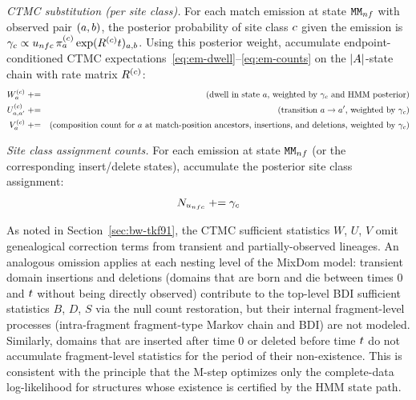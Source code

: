 \emph{CTMC substitution (per site class).}
For each match emission at state ${\tt M}{\tt M}_{nf}$ with observed pair $(a,b)$,
the posterior probability of site class $c$ given the emission is
$\gamma_c \propto u_{nfc}\, \pi^{(c)}_a \exp(R^{(c)} t)_{a,b}$.
Using this posterior weight, accumulate endpoint-conditioned CTMC
expectations~\eqref{eq:em-dwell}--\eqref{eq:em-counts}
on the $|A|$-state chain with rate matrix $R^{(c)}$:
\begin{eqnarray*}
W^{(c)}_a & \mathrel{+}= & \text{(dwell in state $a$, weighted by $\gamma_c$ and HMM posterior)} \\
U^{(c)}_{a,a'} & \mathrel{+}= & \text{(transition $a \to a'$, weighted by $\gamma_c$)} \\
V^{(c)}_a & \mathrel{+}= & \text{(composition count for $a$ at match-position ancestors, insertions, and deletions, weighted by $\gamma_c$)}
\end{eqnarray*}

\emph{Site class assignment counts.}
For each emission at state ${\tt M}{\tt M}_{nf}$ (or the corresponding insert/delete states),
accumulate the posterior site class assignment:
\[
N_{u_{nfc}} \mathrel{+}= \gamma_c
\]

\begin{remark}
\label{rem:genealogical-nested}
As noted in Section~\ref{sec:bw-tkf91},
the CTMC sufficient statistics $W$, $U$, $V$ omit genealogical
correction terms from transient and partially-observed lineages.
An analogous omission applies at each nesting level of the MixDom model:
transient domain insertions and deletions (domains that are born and die
between times $0$ and $t$ without being directly observed) contribute to the
top-level BDI sufficient statistics $B$, $D$, $S$ via the null count restoration,
but their internal fragment-level processes (intra-fragment fragment-type Markov chain and BDI) are not modeled.
Similarly, domains that are inserted after time $0$ or deleted before time $t$
do not accumulate fragment-level statistics for the period of their non-existence.
This is consistent with the principle that the M-step
optimizes only the complete-data log-likelihood for structures whose
existence is certified by the HMM state path.
\end{remark}

